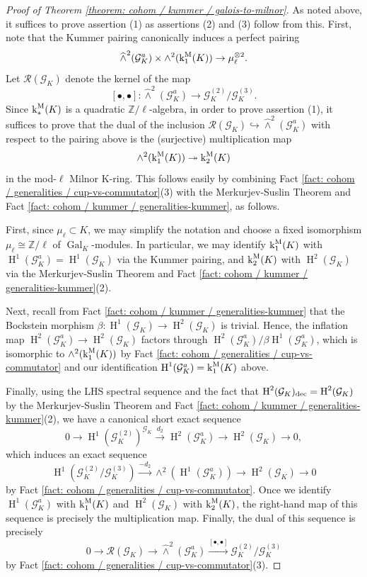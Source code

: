 \documentclass[11pt]{amsart}
\theoremstyle{definition}
\theoremstyle{remark}
\numberwithin{equation}{section}
\DeclareMathOperator{\Gal}{Gal}
\renewcommand{\H}{\operatorname{H}}
\newcommand{\Z}{\mathbb{Z}}
\newcommand{\Gc}{\mathcal{G}}
\newcommand{\Rcal}{\mathcal{R}}
\renewcommand{\k}{\operatorname{k}^{\rm M}}
\begin{document}
\begin{proof}[Proof of Theorem \ref{theorem: cohom / kummer / galois-to-milnor}]
  As noted above, it suffices to prove assertion (1) as assertions (2) and (3) follow from this.
  First, note that the Kummer pairing canonically induces a perfect pairing
  \[ \widehat\wedge^2(\Gc_K^a) \times \wedge^2 (\k_1(K)) \rightarrow \mu_\ell^{\otimes 2}. \]
  Let $\Rcal(\Gc_K)$ denote the kernel of the map
  \[ [\bullet,\bullet] : \widehat\wedge^2(\Gc_K^a) \rightarrow \Gc_K^{(2)}/\Gc_K^{(3)}. \]
  Since $\k_*(K)$ is a quadratic $\Z/\ell$-algebra, in order to prove assertion (1), it suffices to prove that the dual of the inclusion $\Rcal(\Gc_K) \hookrightarrow \widehat\wedge^2(\Gc_K^a)$ with respect to the pairing above is the (surjective) multiplication map 
  \[ \wedge^2 (\k_1(K)) \twoheadrightarrow \k_2(K) \]
  in the mod-$\ell$ Milnor K-ring.
  This follows easily by combining Fact \ref{fact: cohom / generalities / cup-vs-commutator}(3) with the Merkurjev-Suslin Theorem \cite{Merkurjev:1982} and Fact \ref{fact: cohom / kummer / generalities-kummer}, as follows.
  
  First, since $\mu_\ell \subset K$, we may simplify the notation and choose a fixed isomorphism $\mu_\ell \cong \Z/\ell$ of $\Gal_K$-modules.
  In particular, we may identify $\k_1(K)$ with $\H^1(\Gc_K^a) = \H^1(\Gc_K)$ via the Kummer pairing, and $\k_2(K)$ with $\H^2(\Gc_K)$ via the Merkurjev-Suslin Theorem \cite{Merkurjev:1982} and Fact \ref{fact: cohom / kummer / generalities-kummer}(2).

  Next, recall from Fact \ref{fact: cohom / kummer / generalities-kummer} that the Bockstein morphism $\beta : \H^1(\Gc_K) \rightarrow \H^2(\Gc_K)$ is trivial.
  Hence, the inflation map $\H^2(\Gc_K^a) \rightarrow \H^2(\Gc_K)$ factors through $\H^2(\Gc_K^a)/\beta\H^1(\Gc_K^a)$, which is isomorphic to $\wedge^2(\k_1(K))$ by Fact \ref{fact: cohom / generalities / cup-vs-commutator} and our identification $\H^1(\Gc_K^a) = \k_1(K)$ above.

  Finally, using the LHS spectral sequence and the fact that $\H^2(\Gc_K)_{\rm dec} = \H^2(\Gc_K)$ by the Merkurjev-Suslin Theorem and Fact \ref{fact: cohom / kummer / generalities-kummer}(2), we have a canonical short exact sequence
  \[ 0 \rightarrow \H^1(\Gc_K^{(2)})^{\Gc_K} \xrightarrow{d_2} \H^2(\Gc_K^a) \rightarrow \H^2(\Gc_K) \rightarrow 0, \]
  which induces an exact sequence
  \[ \H^1(\Gc_K^{(2)}/\Gc_K^{(3)}) \xrightarrow{-d_2} \wedge^2(\H^1(\Gc_K^a)) \rightarrow \H^2(\Gc_K) \rightarrow 0 \]
  by Fact \ref{fact: cohom / generalities / cup-vs-commutator}.
  Once we identify $\H^1(\Gc_K^a)$ with $\k_1(K)$ and $\H^2(\Gc_K)$ with $\k_2(K)$, the right-hand map of this sequence is precisely the multiplication map.
  Finally, the dual of this sequence is precisely 
  \[ 0 \rightarrow \Rcal(\Gc_K) \rightarrow \widehat\wedge^2(\Gc_K^a) \xrightarrow{[\bullet,\bullet]} \Gc_K^{(2)}/\Gc_K^{(3)} \]
  by Fact \ref{fact: cohom / generalities / cup-vs-commutator}(3).
\end{proof}
\end{document}
